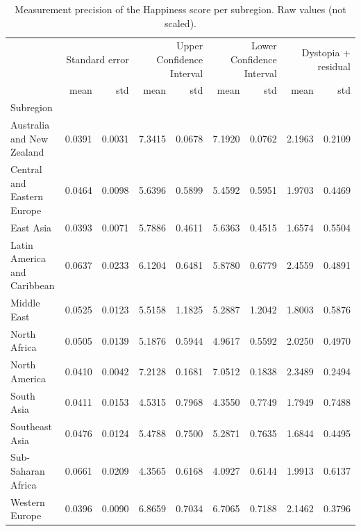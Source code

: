 \begin{table}
\caption{Measurement precision of the Happiness score per subregion. Raw values (not scaled).}
\label{tab:precision-subregion}
\begin{tabular}{lrrrrrrrr}
\toprule
 & \multicolumn{2}{r}{Standard error} & \multicolumn{2}{r}{Upper Confidence Interval} & \multicolumn{2}{r}{Lower Confidence Interval} & \multicolumn{2}{r}{Dystopia + residual} \\
 & mean & std & mean & std & mean & std & mean & std \\
Subregion &  &  &  &  &  &  &  &  \\
\midrule
Australia and New Zealand & 0.0391 & 0.0031 & 7.3415 & 0.0678 & 7.1920 & 0.0762 & 2.1963 & 0.2109 \\
Central and Eastern Europe & 0.0464 & 0.0098 & 5.6396 & 0.5899 & 5.4592 & 0.5951 & 1.9703 & 0.4469 \\
East Asia & 0.0393 & 0.0071 & 5.7886 & 0.4611 & 5.6363 & 0.4515 & 1.6574 & 0.5504 \\
Latin America and Caribbean & 0.0637 & 0.0233 & 6.1204 & 0.6481 & 5.8780 & 0.6779 & 2.4559 & 0.4891 \\
Middle East & 0.0525 & 0.0123 & 5.5158 & 1.1825 & 5.2887 & 1.2042 & 1.8003 & 0.5876 \\
North Africa & 0.0505 & 0.0139 & 5.1876 & 0.5944 & 4.9617 & 0.5592 & 2.0250 & 0.4970 \\
North America & 0.0410 & 0.0042 & 7.2128 & 0.1681 & 7.0512 & 0.1838 & 2.3489 & 0.2494 \\
South Asia & 0.0411 & 0.0153 & 4.5315 & 0.7968 & 4.3550 & 0.7749 & 1.7949 & 0.7488 \\
Southeast Asia & 0.0476 & 0.0124 & 5.4788 & 0.7500 & 5.2871 & 0.7635 & 1.6844 & 0.4495 \\
Sub-Saharan Africa & 0.0661 & 0.0209 & 4.3565 & 0.6168 & 4.0927 & 0.6144 & 1.9913 & 0.6137 \\
Western Europe & 0.0396 & 0.0090 & 6.8659 & 0.7034 & 6.7065 & 0.7188 & 2.1462 & 0.3796 \\
\bottomrule
\end{tabular}
\end{table}
